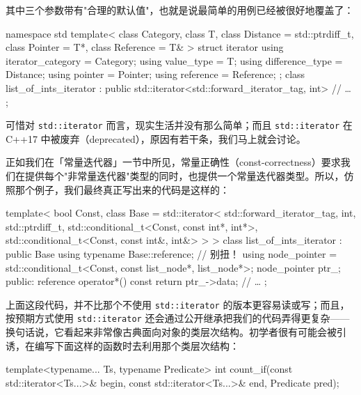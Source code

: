其中三个参数带有"合理的默认值"，也就是说最简单的用例已经被很好地覆盖了：

\begin{codebox}[cpp]
    namespace std {
      template<
        class Category,
        class T,
        class Distance = std::ptrdiff_t,
        class Pointer = T*,
        class Reference = T&
      > struct iterator {
        using iterator_category = Category;
        using value_type = T;
        using difference_type = Distance;
        using pointer = Pointer;
        using reference = Reference;
      };
    }
    class list_of_ints_iterator :
      public std::iterator<std::forward_iterator_tag, int>
    {
       // …
    };
\end{codebox}

可惜对 \texttt{std::\allowbreak{}iterator} 而言，现实生活并没有那么简单；而且 \texttt{std::\allowbreak{}iterator} 在 C++17 中被废弃（deprecated），原因有若干条，我们马上就会讨论。

正如我们在「常量迭代器」一节中所见，常量正确性（const-correctness）要求我们在提供每个"非常量迭代器"类型的同时，也提供一个常量迭代器类型。所以，仿照那个例子，我们最终真正写出来的代码是这样的：

\begin{codebox}[cpp]
    template<
      bool Const,
      class Base = std::iterator<
        std::forward_iterator_tag,
        int,
        std::ptrdiff_t,
        std::conditional_t<Const, const int*, int*>,
        std::conditional_t<Const, const int&, int&>
      >
    >
    class list_of_ints_iterator : public Base
    {
      using typename Base::reference; // 别扭！
      using node_pointer = std::conditional_t<Const, const list_node*,
        list_node*>;
      node_pointer ptr_;
    public:
      reference operator*() const { return ptr_->data; }
      // …
    };
\end{codebox}

上面这段代码，并不比那个不使用 \texttt{std::\allowbreak{}iterator} 的版本更容易读或写；而且，按预期方式使用 \texttt{std::\allowbreak{}iterator} 还会通过公开继承把我们的代码弄得更复杂——换句话说，它看起来非常像古典面向对象的类层次结构。初学者很有可能会被引诱，在编写下面这样的函数时去利用那个类层次结构：

\begin{codebox}[cpp]
    template<typename... Ts, typename Predicate>
    int count_if(const std::iterator<Ts...>& begin,
                 const std::iterator<Ts...>& end,
                 Predicate pred);
\end{codebox}

